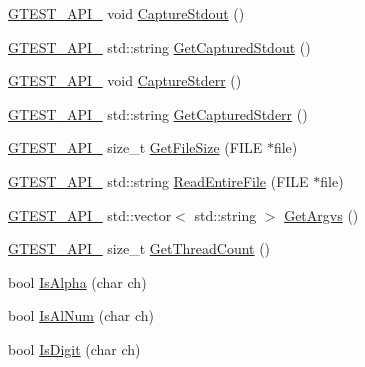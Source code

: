 \begin{DoxyCompactItemize}
\mbox{\hyperlink{gtest-port_8h_aa73be6f0ba4a7456180a94904ce17790}{G\+T\+E\+S\+T\+\_\+\+A\+P\+I\+\_\+}} void \mbox{\hyperlink{namespacetesting_1_1internal_acba06d4f0343dec407738ba5544af990}{Capture\+Stdout}} ()
\item 
\mbox{\hyperlink{gtest-port_8h_aa73be6f0ba4a7456180a94904ce17790}{G\+T\+E\+S\+T\+\_\+\+A\+P\+I\+\_\+}} std\+::string \mbox{\hyperlink{namespacetesting_1_1internal_aed657219a9856a8d249a3230de0c54ce}{Get\+Captured\+Stdout}} ()
\item 
\mbox{\hyperlink{gtest-port_8h_aa73be6f0ba4a7456180a94904ce17790}{G\+T\+E\+S\+T\+\_\+\+A\+P\+I\+\_\+}} void \mbox{\hyperlink{namespacetesting_1_1internal_a8ec00d458d0d442bd64af7b5f9c22dda}{Capture\+Stderr}} ()
\item 
\mbox{\hyperlink{gtest-port_8h_aa73be6f0ba4a7456180a94904ce17790}{G\+T\+E\+S\+T\+\_\+\+A\+P\+I\+\_\+}} std\+::string \mbox{\hyperlink{namespacetesting_1_1internal_a374156401da17704099d0c33fa53adfb}{Get\+Captured\+Stderr}} ()
\item 
\mbox{\hyperlink{gtest-port_8h_aa73be6f0ba4a7456180a94904ce17790}{G\+T\+E\+S\+T\+\_\+\+A\+P\+I\+\_\+}} size\+\_\+t \mbox{\hyperlink{namespacetesting_1_1internal_a06ca3f65f5e85c9ce7299b9e4cd52408}{Get\+File\+Size}} (F\+I\+LE $\ast$file)
\item 
\mbox{\hyperlink{gtest-port_8h_aa73be6f0ba4a7456180a94904ce17790}{G\+T\+E\+S\+T\+\_\+\+A\+P\+I\+\_\+}} std\+::string \mbox{\hyperlink{namespacetesting_1_1internal_a2cc0be60c54a8701423fe5297e1349ee}{Read\+Entire\+File}} (F\+I\+LE $\ast$file)
\item 
\mbox{\hyperlink{gtest-port_8h_aa73be6f0ba4a7456180a94904ce17790}{G\+T\+E\+S\+T\+\_\+\+A\+P\+I\+\_\+}} std\+::vector$<$ std\+::string $>$ \mbox{\hyperlink{namespacetesting_1_1internal_a9608256c67f889006be44912e57e3d4f}{Get\+Argvs}} ()
\item 
\mbox{\hyperlink{gtest-port_8h_aa73be6f0ba4a7456180a94904ce17790}{G\+T\+E\+S\+T\+\_\+\+A\+P\+I\+\_\+}} size\+\_\+t \mbox{\hyperlink{namespacetesting_1_1internal_a3b9b3649cd04558bf46c75de52a7ef34}{Get\+Thread\+Count}} ()
\item 
bool \mbox{\hyperlink{namespacetesting_1_1internal_aeb957087fd6bbf9db98ab7cd41b0c129}{Is\+Alpha}} (char ch)
\item 
bool \mbox{\hyperlink{namespacetesting_1_1internal_a83802e7f23324cd512232203662e1a98}{Is\+Al\+Num}} (char ch)
\item 
bool \mbox{\hyperlink{namespacetesting_1_1internal_a4bd96b7fa6486802d33ddc217af55a39}{Is\+Digit}} (char ch)
\item 

\end{DoxyCompactItemize}
